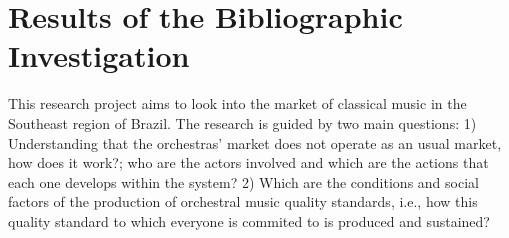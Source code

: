 \documentclass[a4paper, 12pt, openright, oneside, german, french, brazil, english, article]{abntex2}
\begin{document}
	



	\section[Biliographic Investigation]{Results of the Bibliographic Investigation}

	This research project aims to look into the market of classical music in the Southeast region of Brazil. The research is guided by two main questions: 1) Understanding that the orchestras' market does not operate as an usual market, how does it work?;  who are the actors involved and which are the actions that each one develops within the system? 2) Which are the conditions and social factors of the production of orchestral music quality standards, i.e., how this quality standard to which everyone is commited to is produced and sustained?
	
\end{document}
